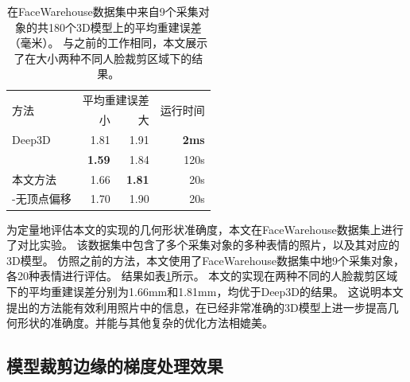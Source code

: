\begin{table}
    \caption[FaceWarehouse数据集上的平均重建误差]{
        在FaceWarehouse数据集中来自9个采集对象的共180个3D模型上的平均重建误差（毫米）。
        与之前的工作相同，本文展示了在大小两种不同人脸裁剪区域下的结果。
    }
    \label{tab:facewarehouse}
    \centering
    \begin{tabular}{l|rrr}
        \toprule
        \multirow{2}{*}{方法} & \multicolumn{2}{c}{平均重建误差} & \multirow{2}{*}{运行时间} \\
        \cmidrule{2-3}
        & 小 & 大 \\
        \midrule
        Deep3D\citep{deep3d} & 1.81 & 1.91 & \textbf{2ms} \\
        \citet{GZCVVPT16} & \textbf{1.59} & 1.84 & 120s \\
        本文方法 & 1.66 & \textbf{1.81} & 20s \\
        \hspace{2ex} -无顶点偏移 & 1.70 & 1.90 & 20s \\
        \bottomrule
    \end{tabular}
\end{table}
为定量地评估本文的实现的几何形状准确度，本文在FaceWarehouse\citep{FaceWarehouse}数据集上进行了对比实验。
该数据集中包含了多个采集对象的多种表情的照片，以及其对应的3D模型。
仿照之前的方法，本文使用了FaceWarehouse数据集中地9个采集对象，各20种表情进行评估。
结果如表\ref{tab:facewarehouse}所示。
本文的实现在两种不同的人脸裁剪区域下的平均重建误差分别为1.66mm和1.81mm，均优于Deep3D的结果。
这说明本文提出的方法能有效利用照片中的信息，在已经非常准确的3D模型上进一步提高几何形状的准确度。并能与其他复杂的优化方法\citep{GZCVVPT16}相媲美。

\subsection{模型裁剪边缘的梯度处理效果}

